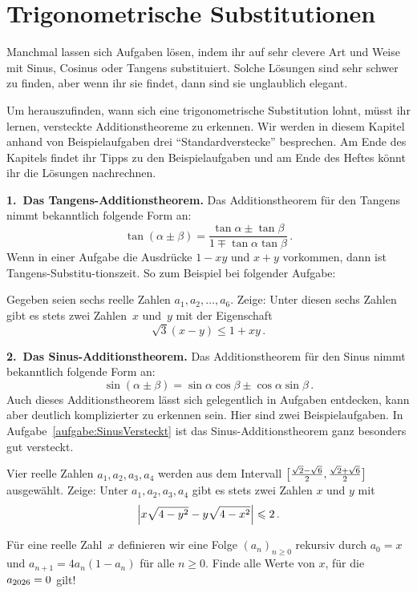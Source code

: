\section{Trigonometrische Substitutionen}\label{kapitel:TrigSub}

Manchmal lassen sich Aufgaben lösen, indem ihr auf sehr clevere Art und Weise mit Sinus, Cosinus oder Tangens substituiert. Solche Lösungen sind sehr schwer zu finden, aber wenn ihr sie findet, dann sind sie unglaublich elegant. 

Um herauszufinden, wann sich eine trigonometrische Substitution lohnt, müsst ihr lernen, versteckte Additionstheoreme zu erkennen. Wir werden in diesem Kapitel anhand von Beispielaufgaben drei \enquote{Standardverstecke} besprechen. Am Ende des Kapitels findet ihr Tipps zu den Beispielaufgaben und am Ende des Heftes könnt ihr die Lösungen nachrechnen.

\textbf{1.~Das Tangens-Additionstheorem.} Das Additionstheorem für den Tangens nimmt bekanntlich folgende Form an:
\begin{equation*}
	\tan(\alpha\pm\beta)=\frac{\tan\alpha\pm\tan\beta}{1\mp\tan\alpha\tan\beta}\,.
\end{equation*}
Wenn in einer Aufgabe die Ausdrücke $1-xy$ und $x+y$ vorkommen, dann ist Tangens-Substitu-tionszeit. So zum Beispiel bei folgender Aufgabe:
\begin{aufgabe*}\label{aufgabe:Tangenssubstitution}
	Gegeben seien sechs reelle Zahlen $a_1,a_2,\dotsc,a_6$. Zeige: Unter diesen sechs Zahlen gibt es stets zwei Zahlen~$x$ und~$y$ mit der Eigenschaft
	\begin{equation*}
		\sqrt{3}(x-y)\leqslant 1+xy\,.
	\end{equation*}
\end{aufgabe*}


\textbf{2.~Das Sinus-Additionstheorem.} Das Additionstheorem für den Sinus nimmt bekanntlich folgende Form an:
\begin{equation*}
	\sin(\alpha\pm\beta)=\sin\alpha\cos\beta\pm\cos\alpha\sin\beta\,.
\end{equation*}
Auch dieses Additionstheorem lässt sich gelegentlich in Aufgaben entdecken, kann aber deutlich komplizierter zu erkennen sein. Hier sind zwei Beispielaufgaben. In Aufgabe~\ref{aufgabe:SinusVersteckt} ist das Sinus-Additionstheorem ganz besonders gut versteckt.
\begin{aufgabe*}\label{aufgabe:SinusWurzelAdditionstheorem}
	Vier reelle Zahlen $a_1,a_2,a_3,a_4$ werden aus dem Intervall $\brackets[\big]{\frac{\sqrt{2}-\sqrt{6}}{2},\frac{\sqrt{2}+\sqrt{6}}{2}}$ ausgewählt. Zeige: Unter $a_1,a_2,a_3,a_4$ gibt es stets zwei Zahlen $x$ und $y$ mit
	\begin{equation*}
		\abs*{x\sqrt{4-y^2}-y\sqrt{4-x^2}}\leqslant 2\,.
	\end{equation*}
\end{aufgabe*}
\begin{aufgabe*}\label{aufgabe:SinusVersteckt}
	Für eine reelle Zahl~$x$ definieren wir eine Folge $(a_n)_{n\geqslant 0}$ rekursiv durch $a_0=x$ und $a_{n+1}=4a_n(1-a_n)$ für alle $n\geqslant 0$. Finde alle Werte von $x$, für die $a_{\the\year}=0$ gilt!
\end{aufgabe*}

